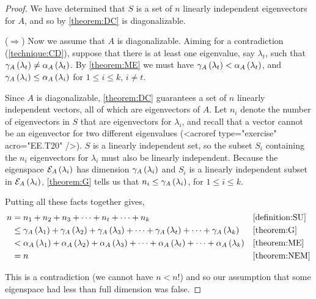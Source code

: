 \documentclass{ximera}
\begin{document}
\begin{theorem}
\begin{proof}
We have determined that $S$ is a set of $n$ linearly independent eigenvectors for $A$, and so by \ref{theorem:DC} is diagonalizable.



($\Rightarrow$)  Now we assume that $A$ is diagonalizable.  Aiming for a contradiction (\ref{technique:CD}), suppose that there is at least one eigenvalue, say $\lambda_t$, such that $\gamma_{A}\left(\lambda_t\right)\neq\alpha_{A}\left(\lambda_t\right)$.  By \ref{theorem:ME} we must have
$\gamma_{A}\left(\lambda_t\right)<\alpha_{A}\left(\lambda_t\right)$,
and $\gamma_{A}\left(\lambda_i\right)\leq\alpha_{A}\left(\lambda_i\right)$ for $1\leq i\leq k$, $i\neq t$.



Since $A$ is diagonalizable, \ref{theorem:DC} guarantees a set of $n$ linearly independent vectors, all of which are eigenvectors of $A$.  Let $n_i$ denote the number of eigenvectors in $S$ that are eigenvectors for $\lambda_i$, and recall that a vector cannot be an eigenvector for two different eigenvalues (<acroref type="exercise" acro="EE.T20" />).  $S$ is a linearly independent set, so the subset $S_i$ containing the $n_i$ eigenvectors for $\lambda_i$ must also be linearly independent.  Because the eigenspace $\mathcal{E}_{A}\left(\lambda_i\right)$ has dimension $\gamma_{A}\left(\lambda_i\right)$ and $S_i$ is a linearly independent subset in $\mathcal{E}_{A}\left(\lambda_i\right)$, \ref{theorem:G} tells us that $n_i\leq\gamma_{A}\left(\lambda_i\right)$, for $1\leq i\leq k$.



Putting all these facts together gives,
\begin{align*}
n
&=n_1+n_2+n_3+\cdots+n_t+\cdots+n_k
&&\ref{definition:SU}\\
&\leq\gamma_{A}\left(\lambda_1\right)+\gamma_{A}\left(\lambda_2\right)+\gamma_{A}\left(\lambda_3\right)+\cdots+\gamma_{A}\left(\lambda_t\right)+\cdots+\gamma_{A}\left(\lambda_k\right)
&&\ref{theorem:G}\\
&<\alpha_{A}\left(\lambda_1\right)+\alpha_{A}\left(\lambda_2\right)+\alpha_{A}\left(\lambda_3\right)+\cdots+\alpha_{A}\left(\lambda_t\right)+\cdots+\alpha_{A}\left(\lambda_k\right)&&\ref{theorem:ME}\\
&=n
&&\ref{theorem:NEM}
\end{align*}




This is a contradiction
(we cannot have $n<n$!)
and so our assumption that some eigenspace had less than full dimension was false.



\end{proof}
\end{theorem}
\end{document}
